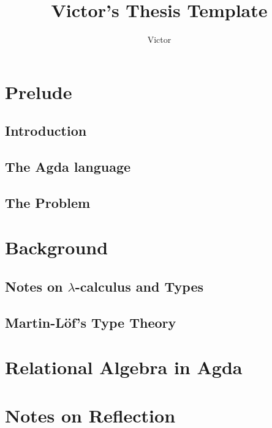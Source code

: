 \documentclass{report}
\title{Victor's Thesis Template}
\author{Victor}
\begin{document}
\maketitle
\tableofcontents

\theoremstyle{plain}
\newtheorem{thm}{Theorem}[chapter]
\newtheorem{crl}{Corolary}[chapter]
\newtheorem{prob}{Problem}[chapter]
\newtheorem{prop}{Proposition}[chapter]

\theoremstyle{definition}
\newtheorem{lemma}{Lemma}[chapter]
\newtheorem{mydef}{Definition}[chapter]
\newtheorem{notation}{Notation}[chapter]

\theoremstyle{remark}
\newtheorem{nota}{Note}[chapter]

\chapter{Prelude}
\label{chap:prelude}

  \section{Introduction}
  \label{sec:prelude:introduction}
  
  
  \section{The Agda language}
  \label{sec:prelude:agdalanguage}
  
  
  \section{The Problem}
  \label{sec:prelude:theproblem}
  
  
\chapter{Background}
\label{chap:background}


  \section{Notes on $\lambda$-calculus and Types}
  \label{sec:background:lambdacalculus}
  
  
  \section{Martin-Löf's Type Theory}
  \label{sec:background:martinlof}
  
  
\chapter{Relational Algebra in Agda}
\label{chap:relationalalgebra}

  
\chapter{Notes on Reflection}
\label{chap:reflection}





\end{document}
